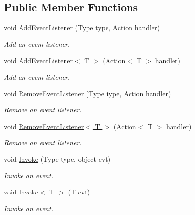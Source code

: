 \subsection*{Public Member Functions}
\begin{DoxyCompactItemize}
\item 
void \hyperlink{interface_events_1_1_i_event_dispatcher_ac22d58973ca79fdaea1471704dba0e01}{Add\+Event\+Listener} (Type type, Action handler)
\begin{DoxyCompactList}\small\item\em Add an event listener. \end{DoxyCompactList}\item 
void \hyperlink{interface_events_1_1_i_event_dispatcher_a4c10e52a26a0c354bcaae21e0a240f93}{Add\+Event\+Listener$<$ T $>$} (Action$<$ T $>$ handler)
\begin{DoxyCompactList}\small\item\em Add an event listener. \end{DoxyCompactList}\item 
void \hyperlink{interface_events_1_1_i_event_dispatcher_ae3209681ebdbcf8289905ff6ccdbd188}{Remove\+Event\+Listener} (Type type, Action handler)
\begin{DoxyCompactList}\small\item\em Remove an event listener. \end{DoxyCompactList}\item 
void \hyperlink{interface_events_1_1_i_event_dispatcher_a86e3438c779746108c3f01dff0c43d23}{Remove\+Event\+Listener$<$ T $>$} (Action$<$ T $>$ handler)
\begin{DoxyCompactList}\small\item\em Remove an event listener. \end{DoxyCompactList}\item 
void \hyperlink{interface_events_1_1_i_event_dispatcher_a3789c396884e0097a4efdd8fb6652214}{Invoke} (Type type, object evt)
\begin{DoxyCompactList}\small\item\em Invoke an event. \end{DoxyCompactList}\item 
void \hyperlink{interface_events_1_1_i_event_dispatcher_ab6e50172a6c4a5ec91977f183278dc91}{Invoke$<$ T $>$} (T evt)
\begin{DoxyCompactList}\small\item\em Invoke an event. \end{DoxyCompactList}\end{DoxyCompactItemize}


